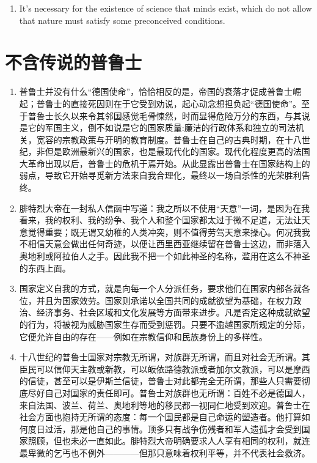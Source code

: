 \documentclass[UTF8]{ctexart}
\begin{document}
\begin{enumerate}
			\item It's necessary for the existence of science that minds exist, which do not allow that nature must satisfy some preconceived conditions.
			
		\end{enumerate}
	
	\newpage
	
	\section{不含传说的普鲁士}
	
	
		\begin{enumerate}
		
		\item 普鲁士并没有什么“德国使命”，恰恰相反的是，帝国的衰落才促成普鲁士崛起；普鲁士的直接死因则在于它受到劝说，起心动念想担负起“德国使命”。至于普鲁士长久以来令其邻国感觉毛骨悚然，时而显得危险万分的东西，与其说是它的军国主义，倒不如说是它的国家质量:廉洁的行政体系和独立的司法机关，宽容的宗教政策与开明的教育制度。普鲁士在自己的古典时期，在十八世纪，非但是欧洲最新兴的国家，也是最现代化的国家。现代化程度更高的法国大革命出现以后，普鲁士的危机于焉开始。从此显露出普鲁士在国家结构上的弱点，导致它开始寻觅新方法来自我合理化，最终以一场自杀性的光荣胜利告终。
		
		\item 腓特烈大帝在一封私人信函中写道：我之所以不使用“天意”一词，是因为在我看来，我的权利、我的纷争、我个人和整个国家都太过于微不足道，无法让天意觉得重要；既无谓又幼稚的人类冲突，则不值得劳驾天意来操心。何况我我不相信天意会做出任何奇迹，以便让西里西亚继续留在普鲁士这边，而非落入奥地利或阿拉伯人之手。因此我不把一个如此神圣的名称，滥用在这么不神圣的东西上面。
		
		\item 国家定义自我的方式，就是向每一个人分派任务，要求他们在国家内部各就各位，并且为国家效劳。国家则承诺以全国共同的成就欲望为基础，在权力政治、经济事务、社会区域和文化发展等方面带来进步。凡是否定这种成就欲望的行为，将被视为威胁国家生存而受到惩罚。只要不逾越国家所规定的分际，它便允许自由的存在——例如在宗教信仰和民族身份上的多样性。
		
		\item 十八世纪的普鲁士国家对宗教无所谓，对族群无所谓，而且对社会无所谓。其臣民可以信仰天主教或新教，可以皈依路德教派或者加尔文教派，可以是摩西的信徒，甚至可以是伊斯兰信徒，普鲁士对此都完全无所谓，那些人只需要彻底尽好自己对国家的责任即可。普鲁士对族群也无所谓：百姓不必是德国人，来自法国、波兰、荷兰、奥地利等地的移民都一视同仁地受到欢迎。普鲁士在社会方面也抱持无所谓的态度：每一个国民都是自己命运的塑造者。他打算如何度日过活，那是他自己的事情。顶多只有战争伤残者和军人遗孤才会受到国家照顾，但也未必一直如此。腓特烈大帝明确要求人人享有相同的权利，就连最卑微的乞丐也不例外————但那只意味着权利平等，并不代表社会救济。
		

\end{enumerate}
\end{document}
